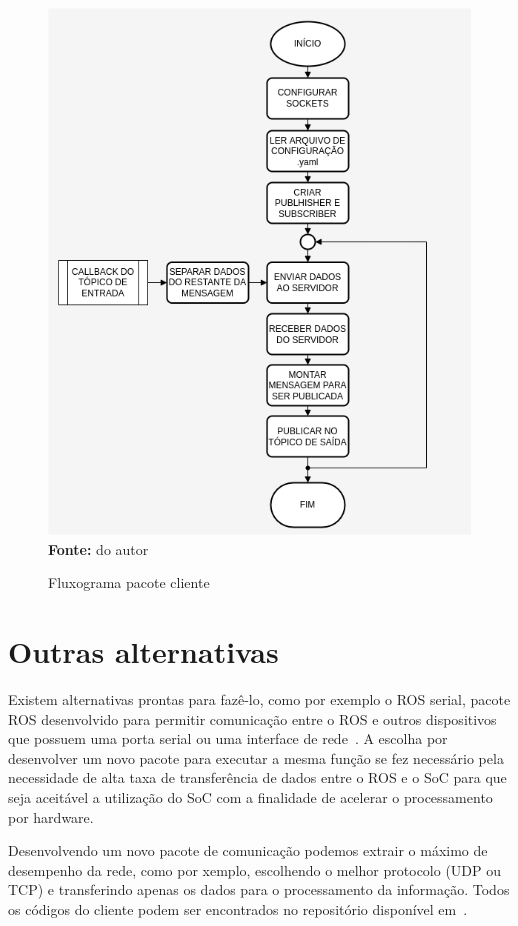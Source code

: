 \begin{figure}[ht]
	\caption{Fluxograma pacote cliente}
	\begin{center}
		\includegraphics[scale=0.47]{imagens/fluxogramaCliente.png}\\
		{\small \textbf{Fonte:} do autor}
    \end{center}\label{fig:clientfluxo}
\end{figure}


\section{Outras alternativas}
Existem alternativas prontas para fazê-lo, como por exemplo o ROS serial, pacote ROS desenvolvido para permitir comunicação entre o ROS e outros dispositivos que possuem uma porta serial ou uma interface de rede~\cite{RosSeria}. A escolha por desenvolver um novo pacote para executar a mesma função se fez necessário pela necessidade de alta taxa de transferência de dados entre o ROS e o SoC para que seja aceitável a utilização do SoC com a finalidade de acelerar o processamento por hardware. 

Desenvolvendo um novo pacote de comunicação podemos extrair o máximo de desempenho da rede, como por  xemplo, escolhendo o melhor protocolo (UDP ou TCP) e transferindo apenas os dados para o processamento da informação. Todos os códigos do cliente podem ser encontrados no repositório disponível em~\cite{interface-socket}.
